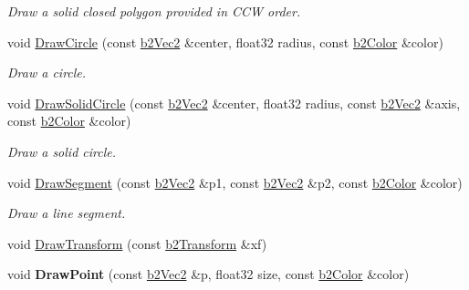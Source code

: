 \begin{DoxyCompactItemize}
\begin{DoxyCompactList}\small\item\em Draw a solid closed polygon provided in C\-C\-W order. \end{DoxyCompactList}\item 
\hypertarget{class_g_l_e_s_debug_draw_a9beacb1f221106e10ea68614ff336bf8}{void \hyperlink{class_g_l_e_s_debug_draw_a9beacb1f221106e10ea68614ff336bf8}{Draw\-Circle} (const \hyperlink{structb2_vec2}{b2\-Vec2} \&center, float32 radius, const \hyperlink{structb2_color}{b2\-Color} \&color)}\label{class_g_l_e_s_debug_draw_a9beacb1f221106e10ea68614ff336bf8}

\begin{DoxyCompactList}\small\item\em Draw a circle. \end{DoxyCompactList}\item 
\hypertarget{class_g_l_e_s_debug_draw_ac06ea317fe6075cb9e1ff87ff89b8007}{void \hyperlink{class_g_l_e_s_debug_draw_ac06ea317fe6075cb9e1ff87ff89b8007}{Draw\-Solid\-Circle} (const \hyperlink{structb2_vec2}{b2\-Vec2} \&center, float32 radius, const \hyperlink{structb2_vec2}{b2\-Vec2} \&axis, const \hyperlink{structb2_color}{b2\-Color} \&color)}\label{class_g_l_e_s_debug_draw_ac06ea317fe6075cb9e1ff87ff89b8007}

\begin{DoxyCompactList}\small\item\em Draw a solid circle. \end{DoxyCompactList}\item 
\hypertarget{class_g_l_e_s_debug_draw_a2a24d1fe4eb99b6382380c234ab77382}{void \hyperlink{class_g_l_e_s_debug_draw_a2a24d1fe4eb99b6382380c234ab77382}{Draw\-Segment} (const \hyperlink{structb2_vec2}{b2\-Vec2} \&p1, const \hyperlink{structb2_vec2}{b2\-Vec2} \&p2, const \hyperlink{structb2_color}{b2\-Color} \&color)}\label{class_g_l_e_s_debug_draw_a2a24d1fe4eb99b6382380c234ab77382}

\begin{DoxyCompactList}\small\item\em Draw a line segment. \end{DoxyCompactList}\item 
void \hyperlink{class_g_l_e_s_debug_draw_a2306fb12b6f6e69d84fcb79bcddfcfbf}{Draw\-Transform} (const \hyperlink{structb2_transform}{b2\-Transform} \&xf)
\item 
\hypertarget{class_g_l_e_s_debug_draw_a84ce73b36e8b9e2843b2deacebeee839}{void {\bfseries Draw\-Point} (const \hyperlink{structb2_vec2}{b2\-Vec2} \&p, float32 size, const \hyperlink{structb2_color}{b2\-Color} \&color)}\label{class_g_l_e_s_debug_draw_a84ce73b36e8b9e2843b2deacebeee839}


\end{DoxyCompactItemize}
